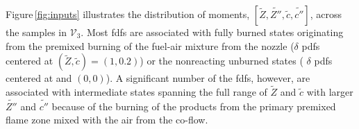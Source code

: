 \documentclass[review]{elsarticle}
\newcommand{\wt}[1]{\widetilde{#1}}
\begin{document}

Figure\,\ref{fig:inputs} illustrates the distribution of moments,
$\left[\wt{Z}, \wt{Z''}, \wt{c}, \wt{c''}\right]$, across the samples
in $\mathcal{V}_3$. Most \glspl{fdf} are associated with fully burned
states originating from the premixed burning of the fuel-air mixture
from the nozzle ($\delta$ \glspl{pdf} centered at $\left( \wt{Z}, \wt{c} \right) = (1,0.2)$) or the nonreacting unburned states (
$\delta$ \glspl{pdf} centered at
 and $(0,0)$). A significant number of the \glspl{fdf},
however, are associated with intermediate states spanning the full
range of $\wt{Z}$ and $\wt{c}$ with larger $\wt{Z''}$ and $\wt{c''}$
because of the burning of the products from the primary premixed flame
zone mixed with the air from the co-flow. 
\end{document}
